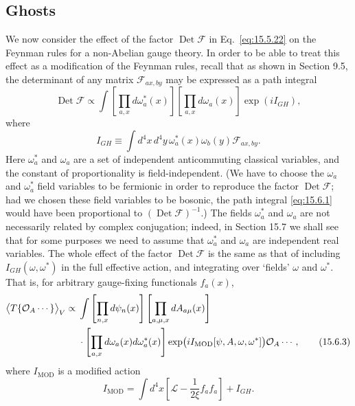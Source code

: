 
\subsection{Ghosts}

We now consider the effect of the factor $\operatorname{Det}\mathcal F$ in
Eq.~\eqref{eq:15.5.22} on the Feynman rules for a non-Abelian gauge theory. In
order to be able to treat this effect as a modification of the Feynman rules,
recall that as shown in Section 9.5, the determinant of any matrix
$\mathcal F_{a x,b y}$ may be expressed as a path integral
\begin{equation}
  \operatorname{Det}\mathcal F\propto
  \int\left[\prod_{a,x}d\omega_a^*(x)\right]
  \left[\prod_{a,x}d\omega_a(x)\right]\exp(iI_{GH}),
  \tag{15.6.1}\label{eq:15.6.1}
\end{equation}
where
\begin{equation}
  I_{GH}\equiv\int d^4x\,d^4y\,
  \omega_a^*(x)\omega_b(y)\mathcal F_{a x,b y}.
  \tag{15.6.2}\label{eq:15.6.2}
\end{equation}
Here $\omega_a^*$ and $\omega_a$ are a set of independent
anticommuting classical variables, and the constant of proportionality is
field-independent. (We have to choose the $\omega_a$ and
$\omega_a^*$ field variables to be fermionic in order to reproduce the
factor $\operatorname{Det}\mathcal F$; had we chosen these field variables to
be bosonic, the path integral \eqref{eq:15.6.1} would have been proportional to
$(\operatorname{Det}\mathcal F)^{-1}$.) The fields $\omega_a^*$ and
$\omega_a$ are not necessarily related by complex conjugation; indeed,
in Section 15.7 we shall see that for some purposes we need to assume that
$\omega_a^*$ and $\omega_a$ are independent real variables. The
whole effect of the factor $\operatorname{Det}\mathcal F$ is the same as that
of including $I_{GH}(\omega,\omega^*)$ in the full effective action, and
integrating over `fields' $\omega$ and $\omega^*$. That is, for arbitrary
gauge-fixing functionals $f_a(x)$,
\begin{align}
  \bigl\langle T\{\mathcal O_A\cdots\}\bigr\rangle_V
  \propto{}&\int\left[\prod_{n,x}d\psi_n(x)\right]
  \left[\prod_{a,\mu,x}dA_{a\mu}(x)\right]
  \notag\\
  &\mathbin{\cdot}\left[\prod_{a,x}
  d\omega_a(x)d\omega_a^*(x)\right]
  \exp\bigl(iI_{\mathrm{MOD}}[\psi,A,\omega,\omega^*]\bigr)
  \mathcal O_A\cdots,
  \tag{15.6.3}\label{eq:15.6.3}
\end{align}
where $I_{\mathrm{MOD}}$ is a modified action
\begin{equation}
  I_{\mathrm{MOD}}=\int d^4x
  \left[\mathcal L-\frac{1}{2\xi}f_a f_a\right]+I_{GH}.
  \tag{15.6.4}\label{eq:15.6.4}
\end{equation}


